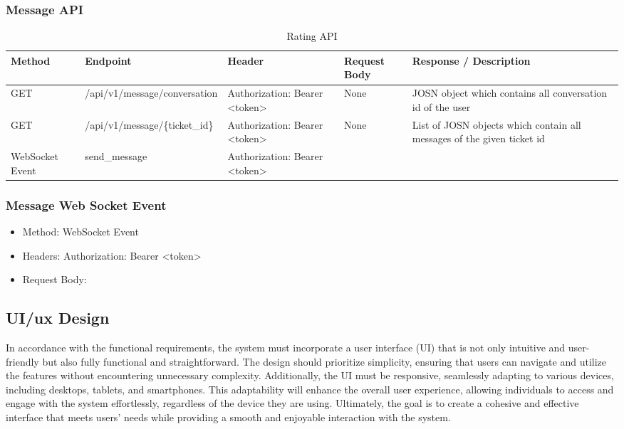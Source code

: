 \subsubsection{Message API}

\begin{longtable}{|m{1.6cm}|m{5cm}|m{3cm}|m{3cm}|m{3.2cm}|}
	\hline
	\textbf{Method} & \textbf{Endpoint} & \textbf{Header}                                                                                                                            & \textbf{Request Body} & \textbf{Response / Description}   \\ \hline
	\endhead
	
	GET & /api/v1/message/conversation & Authorization: Bearer <token>  & None & JOSN object which contains all conversation id of the user\\ \hline
	
	GET & /api/v1/message/\{ticket\_id\} & Authorization: Bearer <token>  & None & List of JOSN objects which contain all messages of the given ticket id\\ \hline
	
	WebSocket \newline Event & send\_message &  Authorization: Bearer <token> & 
	
	\caption{Rating API}
	\label{tab:message-api}
	
\end{longtable}

\subsubsection{Message Web Socket Event}

	\begin{itemize}
		\item Method: WebSocket Event
		\item Headers: Authorization: Bearer <token> 
		\item Request Body: 
	\end{itemize}



\subsection{UI/\acs{ux} Design}
In accordance with the functional requirements, the system must incorporate a user interface (UI) that is not only intuitive and user-friendly but also fully functional and straightforward. The design should prioritize simplicity, ensuring that users can navigate and utilize the features without encountering unnecessary complexity. Additionally, the UI must be responsive, seamlessly adapting to various devices, including desktops, tablets, and smartphones. This adaptability will enhance the overall user experience, allowing individuals to access and engage with the system effortlessly, regardless of the device they are using. Ultimately, the goal is to create a cohesive and effective interface that meets users' needs while providing a smooth and enjoyable interaction with the system.

